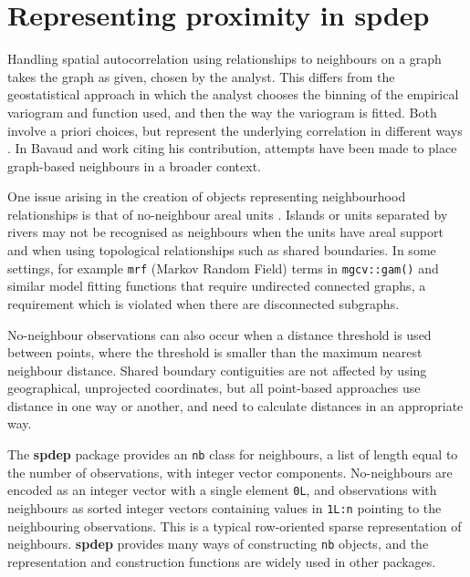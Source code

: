 \documentclass[]{book}
\begin{document}
\hypertarget{representing-proximity-in-spdep}{%
\section{\texorpdfstring{Representing proximity in \textbf{spdep}}{Representing proximity in spdep}}\label{representing-proximity-in-spdep}}

Handling spatial autocorrelation using relationships to neighbours on a graph takes the graph as given, chosen by the analyst. This differs from the geostatistical approach in which the analyst chooses the binning of the empirical variogram and function used, and then the way the variogram is fitted. Both involve a priori choices, but represent the underlying correlation in different ways \citep{wall:04}. In Bavaud \citeyearpar{bavaud:98} and work citing his contribution, attempts have been made to place graph-based neighbours in a broader context.

One issue arising in the creation of objects representing neighbourhood relationships is that of no-neighbour areal units \citep{bivand+portnov:04}. Islands or units separated by rivers may not be recognised as neighbours when the units have areal support and when using topological relationships such as shared boundaries. In some settings, for example \texttt{mrf} (Markov Random Field) terms in \texttt{mgcv::gam()} and similar model fitting functions that require undirected connected graphs, a requirement which is violated when there are disconnected subgraphs.

No-neighbour observations can also occur when a distance threshold is used between points, where the threshold is smaller than the maximum nearest neighbour distance. Shared boundary contiguities are not affected by using geographical, unprojected coordinates, but all point-based approaches use distance in one way or another, and need to calculate distances in an appropriate way.

The \textbf{spdep} package provides an \texttt{nb} class for neighbours, a list of length equal to the number of observations, with integer vector components. No-neighbours are encoded as an integer vector with a single element \texttt{0L}, and observations with neighbours as sorted integer vectors containing values in \texttt{1L:n} pointing to the neighbouring observations. This is a typical row-oriented sparse representation of neighbours. \textbf{spdep} provides many ways of constructing \texttt{nb} objects, and the representation and construction functions are widely used in other packages.
\end{document}
